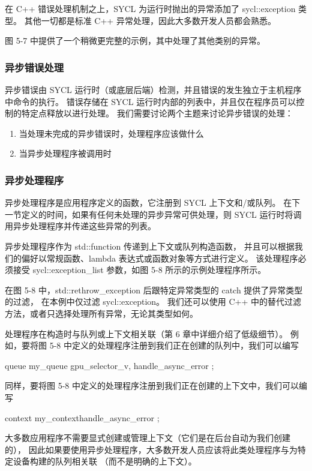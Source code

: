 在 C++ 错误处理机制之上，SYCL 为运行时抛出的异常添加了 sycl::exception 类型。 
其他一切都是标准 C++ 异常处理，因此大多数开发人员都会熟悉。

图 5-7 中提供了一个稍微更完整的示例，其中处理了其他类别的异常。

\subsubsection{异步错误处理}
异步错误由 SYCL 运行时（或底层后端）检测，并且错误的发生独立于主机程序中命令的执行。 
错误存储在 SYCL 运行时内部的列表中，并且仅在程序员可以控制的特定点释放以进行处理。 
我们需要讨论两个主题来讨论异步错误的处理：

\begin{enumerate}
	\item 当处理未完成的异步错误时，处理程序应该做什么
	\item 当异步处理程序被调用时
\end{enumerate}

\subsubsection{异步处理程序}
异步处理程序是应用程序定义的函数，它注册到 SYCL 上下文和/或队列。 
在下一节定义的时间，如果有任何未处理的异步异常可供处理，则 SYCL 运行时将调用异步处理程序并传递这些异常的列表。

异步处理程序作为 std::function 传递到上下文或队列构造函数，
并且可以根据我们的偏好以常规函数、lambda 表达式或函数对象等方式进行定义。 
该处理程序必须接受 sycl::exception\_list 参数，如图 5-8 所示的示例处理程序所示。

在图 5-8 中，std::rethrow\_exception 后跟特定异常类型的 catch 提供了异常类型的过滤，
在本例中仅过滤 sycl::exception。 我们还可以使用 C++ 中的替代过滤方法，或者只选择处理所有异常，无论其类型如何。

处理程序在构造时与队列或上下文相关联（第 6 章中详细介绍了低级细节）。 
例如，要将图 5-8 中定义的处理程序注册到我们正在创建的队列中，我们可以编写

queue my\_queue{ gpu\_selector\_v, handle\_async\_error };

同样，要将图 5-8 中定义的处理程序注册到我们正在创建的上下文中，我们可以编写

context my\_context{handle\_async\_error };

大多数应用程序不需要显式创建或管理上下文（它们是在后台自动为我们创建的），
因此如果要使用异步处理程序，大多数开发人员应该将此类处理程序与为特定设备构建的队列相关联 （而不是明确的上下文）。

